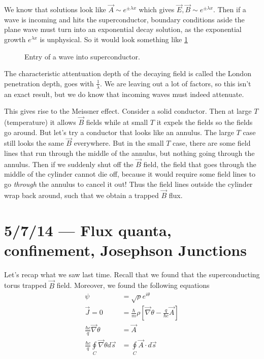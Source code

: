 \documentclass[10pt]{report}
\begin{document}
We know that solutions look like $\vec{A} \sim e^{\pm \lambda x}$ which gives $\vec{E}, \vec{B} \sim e^{\pm \lambda x}$. Then if a wave is incoming and hits the superconductor, boundary conditions aside the plane wave must turn into an exponential decay solution, as the exponential growth $e^{\lambda x}$ is unphysical. So it would look something like \ref{5.5.conductorGraph}
\begin{figure}[!h]
    \centering
    \caption{Entry of a wave into superconductor.}
    \label{5.5.conductorGraph}
\end{figure}

The characteristic attentuation depth of the decaying field is called the London penetration depth, goes with $\frac{1}{\lambda}$. We are leaving out a lot of factors, so this isn't an exact result, but we do know that incoming waves must indeed attenuate.

This gives rise to the Meissner effect. Consider a solid conductor. Then at large $T$ (temperature) it allows $\vec{B}$ fields while at small $T$ it expels the fields so the fields go around. But let's try a conductor that looks like an annulus. The large $T$ case still looks the same $\vec{B}$ everywhere. But in the small $T$ case, there are some field lines that run through the middle of the annulus, but nothing going through the annulus. Then if we suddenly shut off the $\vec{B}$ field, the field that goes through the middle of the cylinder cannot die off, because it would require some field lines to go \emph{through} the annulus to cancel it out! Thus the field lines outside the cylinder wrap back around, such that we obtain a trapped $\vec{B}$ flux. 

\chapter{5/7/14 --- Flux quanta, confinement, Josephson Junctions}

Let's recap what we saw last time. Recall that we found that the superconducting torus trapped $\vec{B}$ field. Moreover, we found the following equations
\begin{align}
    \psi &= \sqrt{\rho}e^{i\theta}\\
    \vec{J} = 0 &= \frac{\hbar}{m}\rho\left[ \vec{\nabla} \theta - \frac{q}{\hbar c}\vec{A} \right]\\
    \frac{\hbar c}{q}\vec{\nabla} \theta &= \vec{A}\\
    \frac{\hbar c}{q} \oint\limits_C \vec{\nabla} \theta d\vec{s} &= \oint\limits_C \vec{A} \cdot d\vec{s}
\end{align}
\end{document}
